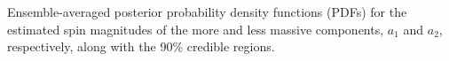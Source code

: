 Ensemble-averaged posterior probability density functions (PDFs) for the estimated spin magnitudes of the more and less massive components, $a_1$ and $a_2$, respectively, along with the 90\% credible regions.